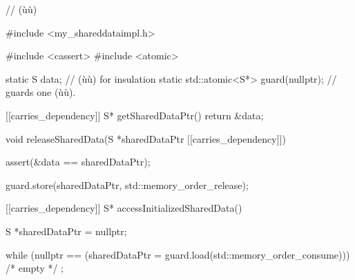 \newpage%
\begin{emcppslisting}
// (ù{}ù)                                                        
                                                                                
#include <my_shareddataimpl.h>                                                  
                                                                                
#include <cassert>                                                              
#include <atomic>                                                               
                                                                                
static S               data;           // (ù{}ù) for insulation               
static std::atomic<S*> guard(nullptr); // guards one (ù{}ù).                
                                                                                
[[carries_dependency]] S* getSharedDataPtr()                                    
{                                                                               
    return &data;                                                               
}                                                                               
                                                                                
void releaseSharedData(S *sharedDataPtr [[carries_dependency]])                 
{                                                                               
    assert(&data == sharedDataPtr);                                             
                                                                                
    guard.store(sharedDataPtr, std::memory_order_release);                      
}                                                                               
                                                                                
[[carries_dependency]] S* accessInitializedSharedData()                         
{                                                                               
    S *sharedDataPtr = nullptr;                                                 
                                                                                
    while (nullptr == (sharedDataPtr = guard.load(std::memory_order_consume)))  
        /* empty */ ;                                                           
                                                                                
}
\end{emcppslisting}
